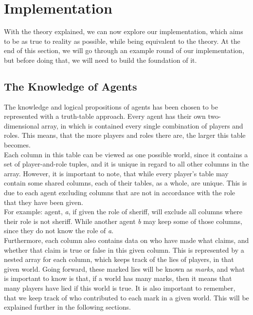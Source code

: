 \section{Implementation}\label{sec:implementation}
With the theory explained, we can now explore our implementation, which aims to
be as true to reality as possible, while being equivalent to the theory. At the
end of this section, we will go through an example round of our implementation,
but before doing that, we will need to build the foundation of it.
\subsection{The Knowledge of Agents}\label{TheKnowledgeOfAgents}
The knowledge and logical propositions of agents has been chosen to be
represented with a truth-table approach. Every agent has their own
two-dimensional array, in which is contained every single combination of
players and roles. This means, that the more players and roles there are, the
larger this table becomes.\\ Each column in this table can be viewed as one
possible world, since it contains a set of player-and-role tuples, and it is
unique in regard to all other columns in the array. However, it is important to
note, that while every player's table may contain some shared columns, each of
their tables, as a whole, are unique. This is due to each agent excluding
columns that are not in accordance with the role that they have been given.\\
For example: agent, \textit{a}, if given the role of sheriff, will exclude all
columns where their role is not sheriff. While another agent \textit{b} may
keep some of those columns, since they do not know the role of \textit{a}.\\
Furthermore, each column also contains data on who have made what claims, and
whether that claim is true or false in this given column. This is represented
by a nested array for each column, which keeps track of the lies of players, in
that given world. Going forward, these marked lies will be known as
\textit{marks}, and what is important to know is that, if a world has many
marks, then it means that many players have lied if this world is true. It is
also important to remember, that we keep track of who contributed to each mark
in a given world. This will be explained further in the following sections.

